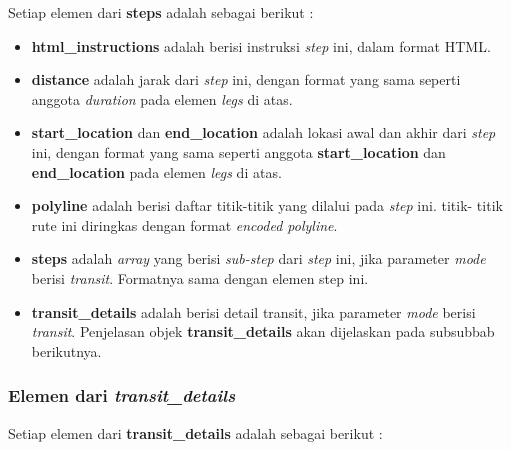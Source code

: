 Setiap elemen dari \textbf{steps} adalah sebagai berikut :

\begin{itemize}
	\item \textbf{html\_instructions} adalah berisi instruksi \textit{step} ini, dalam format HTML.
	\item \textbf{distance} adalah jarak dari \textit{step} ini, dengan format yang sama seperti anggota \textit{duration} pada elemen \textit{legs} di atas.
	\item \textbf{start\_location} dan \textbf{end\_location} adalah lokasi awal dan akhir dari \textit{step} ini, dengan format yang sama seperti anggota \textbf{start\_location} dan \textbf{end\_location} pada elemen \textit{legs} di atas.
	\item \textbf{polyline} adalah berisi daftar titik-titik yang dilalui pada \textit{step} ini. titik- titik rute ini diringkas dengan format \textit{encoded polyline}.
	\item \textbf{steps} adalah \textit{array} yang berisi \textit{sub-step} dari \textit{step} ini, jika parameter \textit{mode} berisi \textit{transit}. Formatnya sama dengan elemen step ini.
	\item \textbf{transit\_details} adalah berisi detail transit, jika parameter \textit{mode} berisi \textit{transit}. Penjelasan objek \textbf{transit\_details} akan dijelaskan pada subsubbab berikutnya.
\end{itemize}

\subsubsection{Elemen dari \textit{transit\_details}}
\label{subsubsec:elementransitdetail}

Setiap elemen dari \textbf{transit\_details} adalah sebagai berikut :

